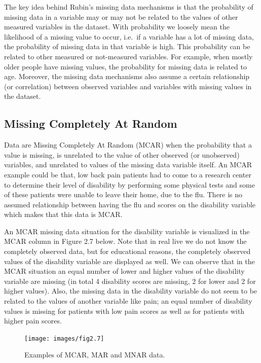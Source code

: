 \documentclass[
]{book}
\begin{document}
The key idea behind Rubin's missing data mechanisms is that the probability of missing data in a variable may or may not be related to the values of other measured variables in the dataset. With probability we loosely mean the likelihood of a missing value to occur, i.e.~if a variable has a lot of missing data, the probability of missing data in that variable is high. This probability can be related to other measured or not-measured variables. For example, when mostly older people have missing values, the probability for missing data is related to age. Moreover, the missing data mechanisms also assume a certain relationship (or correlation) between observed variables and variables with missing values in the dataset.

\hypertarget{missing-completely-at-random}{%
\subsection{Missing Completely At Random}\label{missing-completely-at-random}}

Data are Missing Completely At Random (MCAR) when the probability that a value is missing, is unrelated to the value of other observed (or unobserved) variables, and unrelated to values of the missing data variable itself. An MCAR example could be that, low back pain patients had to come to a research center to determine their level of disability by performing some physical tests and some of these patients were unable to leave their home, due to the flu. There is no assumed relationship between having the flu and scores on the disability variable which makes that this data is MCAR.

An MCAR missing data situation for the disability variable is visualized in the MCAR column in Figure 2.7 below. Note that in real live we do not know the completely observed data, but for educational reasons, the completely observed values of the disability variable are displayed as well. We can observe that in the MCAR situation an equal number of lower and higher values of the disability variable are missing (in total 4 disability scores are missing, 2 for lower and 2 for higher values). Also, the missing data in the disability variable do not seem to be related to the values of another variable like pain; an equal number of disability values is missing for patients with low pain scores as well as for patients with higher pain scores.

\begin{figure}

{\centering \texttt{[image: images/fig2.7]} 

}

\caption{Examples of MCAR, MAR and MNAR data.}\label{fig:fig2-7}
\end{figure}
\end{document}
